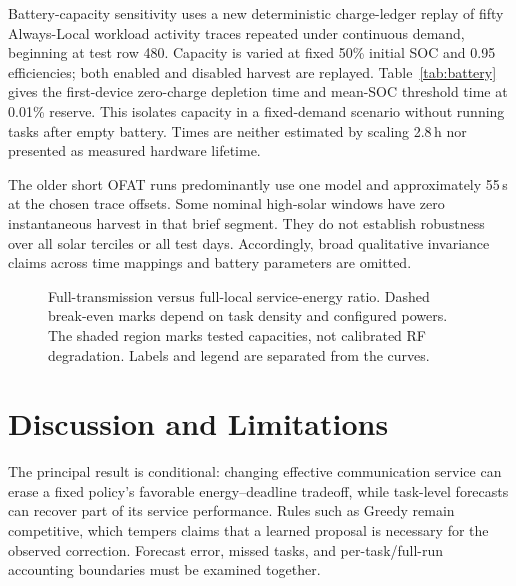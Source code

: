 \documentclass[conference]{IEEEtran}
\begin{document}
Battery-capacity sensitivity uses a new deterministic charge-ledger replay of fifty Always-Local workload activity traces repeated under continuous demand, beginning at test row 480. Capacity is varied at fixed 50\% initial SOC and 0.95 efficiencies; both enabled and disabled harvest are replayed. Table~\ref{tab:battery} gives the first-device zero-charge depletion time and mean-SOC threshold time at 0.01\% reserve. This isolates capacity in a fixed-demand scenario without running tasks after empty battery. Times are neither estimated by scaling 2.8\,h nor presented as measured hardware lifetime.

The older short OFAT runs predominantly use one model and approximately 55\,s at the chosen trace offsets. Some nominal high-solar windows have zero instantaneous harvest in that brief segment. They do not establish robustness over all solar terciles or all test days. Accordingly, broad qualitative invariance claims across time mappings and battery parameters are omitted.

\begin{figure}[t]\centering
{}
\caption{Full-transmission versus full-local service-energy ratio. Dashed break-even marks depend on task density and configured powers. The shaded region marks tested capacities, not calibrated RF degradation. Labels and legend are separated from the curves.}
\label{fig:boundary}\end{figure}

\section{Discussion and Limitations}
The principal result is conditional: changing effective communication service can erase a fixed policy's favorable energy--deadline tradeoff, while task-level forecasts can recover part of its service performance. Rules such as Greedy remain competitive, which tempers claims that a learned proposal is necessary for the observed correction. Forecast error, missed tasks, and per-task/full-run accounting boundaries must be examined together.
\end{document}
